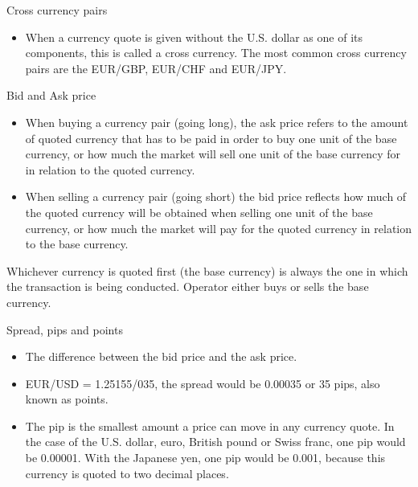 \documentclass[international_finance_p1.tex]{subfiles}
\begin{document}
\begin{frame}{Cross currency pairs}
\begin{itemize}[<+->]
\item
When a currency quote is given without the U.S. dollar as one of its components, this is called a cross currency. The most common cross currency pairs are the EUR/GBP, EUR/CHF and EUR/JPY.
\end{itemize}
\end{frame}
\begin{frame}{Bid and Ask price}
\begin{itemize}[<+->]
\item
When buying a currency pair (going long), the ask price refers to the amount of quoted currency that has to be paid in order to buy one unit of the base currency, or how much the market will sell one unit of the base currency for in relation to the quoted currency.
\item
When selling a currency pair (going short) the bid price reflects how much of the quoted currency will be obtained when selling one unit of the base currency, or how much the market will pay for the quoted currency in relation to the base currency.
\end{itemize}
\end{frame}
\begin{frame}{}
Whichever currency is quoted first (the base currency) is always the one in which the transaction is being conducted. Operator either buys or sells the base currency.
\end{frame}
\begin{frame}{Spread, pips and points}
\begin{itemize}[<+->]
\item
The difference between the bid price and the ask price.
\item
EUR/USD = 1.25155/035, the spread would be 0.00035 or 35 pips, also known as points.
\item
The pip is the smallest amount a price can move in any currency quote. In the case of the U.S. dollar, euro, British pound or Swiss franc, one pip would be 0.00001. With the Japanese yen, one pip would be 0.001, because this currency is quoted to two decimal places.
\end{itemize}
\end{frame}
\end{document}
